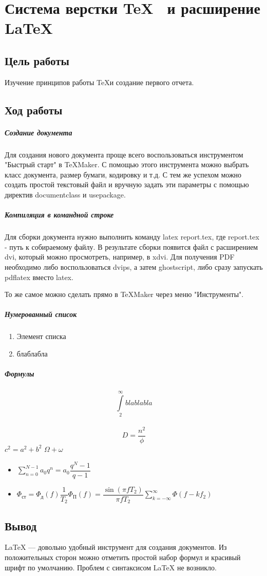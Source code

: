 \chapter{Система верстки \TeX~ и расширение \LaTeX}
\section{Цель работы}
Изучение принципов работы \TeX и создание первого отчета.
\section{Ход работы}
\paragraph{Создание документа}

Для создания нового документа проще всего воспользоваться инструментом "Быстрый старт" в TeXMaker. С помощью этого инструмента можно выбрать класс документа, размер бумаги, кодировку и т.д. С тем же успехом можно создать простой текстовый файл и вручную задать эти параметры с помощью директив documentclass и usepackage.

\paragraph{Компиляция в командной строке}

Для сборки документа нужно выполнить команду latex report.tex, где report.tex - путь к собираемому файлу. В результате сборки появится файл с расширением dvi, который можно просмотреть, например, в xdvi. Для получения PDF необходимо либо воспользоваться dvips, а затем ghostscript, либо сразу запускать pdflatex вместо latex.

То же самое можно сделать прямо в TeXMaker через меню "Инструменты".

\paragraph{Нумерованный список}
\begin{enumerate}
\item Элемент списка
\item блаблабла
\end{enumerate}
\paragraph{Формулы}
$$\int\limits_2^{\infty} blablabla$$
\\
$$D = \frac{n^2}{\phi}$$
\hspace{10cm} $c^2=a^2+b^2$
$\Omega + 
\omega$
\begin{itemize}
\item $\sum\limits_{n=0}^{N-1} a_0 q^n = a_0 \dfrac{q^N-1}{q-1}$

\item $\Phi_\text{ст} = \Phi_\text{д}(f) \dfrac{1}{T_2} \Phi_\text{П}(f) = \dfrac{\sin(\pi f T_2)}{\pi f T_2} \sum\limits_{k=-\infty}^{\infty} \Phi (f - k f_2)$
\end{itemize}
\section{Вывод}
\LaTeX{} --- довольно удобный инструмент для создания документов. Из положительных сторон можно отметить простой набор формул и красивый шрифт по умолчанию. Проблем с синтаксисом \LaTeX{} не возникло.